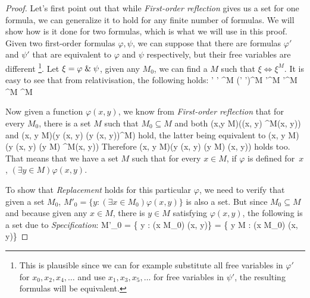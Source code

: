 \begin{proof}
Let's first point out that while \emph{First-order reflection} gives us a set for one formula, we can generalize it to hold for any finite number of formulas. We will show how is it done for two formulas, which is what we will use in this proof. Given two first-order formulas $\varphi, \psi$, we can suppose that there are formulas $\varphi'$ and $\psi'$ that are equivalent to $\varphi$ and $\psi$ respectively, but their free variables are different \footnote{This is plausible since we can for example substitute all free variables in $\varphi'$ for $x_0, x_2, x_4, \ldots$ and use $x_1, x_3, x_5, \ldots$ for free variables in $\psi'$, the resulting formulas will be equivalent.}. Let $\xi = \varphi \mathrel{\&} \psi$, given any $M_0$, we can find a $M$ such that $\xi \iff \xi^M$. It is easy to see that from relativisation, the following holds:
\beq
\varphi \et \psi \iff \varphi' \et \psi' \iff \xi \iff \xi^M \iff (\varphi' \et \psi')^M \iff \varphi'^M \et \psi'^M \iff \varphi^M \et \psi^M
\eeq

Now given a function $\varphi(x, y)$, we know from \emph{First-order reflection} that for every $M_0$, there is a set $M$ such that $M_0 \subseteq M$ and both
\beq
(\forall x,y \in M)(\varphi(x, y) \iff \varphi^M(x, y))
\eeq 
and
\beq
(\forall x, y \in M)(\exists y \varphi(x, y) \iff (\exists y \varphi(x, y))^M)
\eeq 
hold, the latter being equivalent to 
\beq
(\forall x, y \in M)(\exists y \varphi(x, y) \iff (\exists y \in M) \varphi^M(x, y))
\eeq
Therefore 
\beq
(\forall x, y \in M)(\exists y \varphi(x, y) \iff (\exists y \in M) \varphi(x, y))
\eeq
holds too.
That means that we have a set $M$ such that for every $x \in M$, if $\varphi$ is defined for~$x$, $(\exists y \in M) \varphi(x, y)$. 

To show that \emph{Replacement} holds for this particular $\varphi$, we need to verify that given a set $M_0$, $M'_0 = \{ y : (\exists x \in M_0) \varphi(x, y)\}$ is also a set. But since $M_0 \subseteq M$ and because given any $x \in M$, there is $y \in M$ satisfying $\varphi(x, y)$, the following is a set due to \emph{Specification}:
\beq
M'_0 = \{ y : (\exists x \in M_0) \varphi(x, y)\} = \{ y \in M : (\exists x \in M_0) \varphi(x, y)\}
\eeq

\end{proof}

